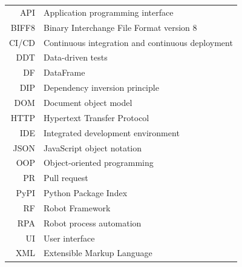 \documentclass[czech,bachelor,twoside,bw]{ctufit-thesis}
\begin{document}



\printtwopageabstract

\tableofcontents %
\listoffigures %
\begingroup
\let\clearpage\relax
\thectufitlistingscommand{} %
\thectufitlistofalgorithmscommand{} %
\endgroup

\chapter{\thectufitabbreviationlabel}

\begin{tabular}{rl}
    API   & Application programming interface \\
    BIFF8 & Binary Interchange File Format version 8 \\
    CI/CD & Continuous integration and continuous deployment \\
    DDT   & Data-driven tests \\
    DF    & DataFrame \\
    DIP   & Dependency inversion principle \\
    DOM   & Document object model \\
    HTTP  & Hypertext Transfer Protocol \\
    IDE   & Integrated development environment \\
    JSON  & JavaScript object notation \\
    OOP   & Object-oriented programming \\
    PR    & Pull request \\
    PyPI  & Python Package Index \\
    RF    & Robot Framework \\
    RPA   & Robot process automation \\
    UI    & User interface \\
    XML   & Extensible Markup Language \\
\end{tabular}
\resumeTOCentries
\mainmatter\mainmatterinit %
\end{document}
